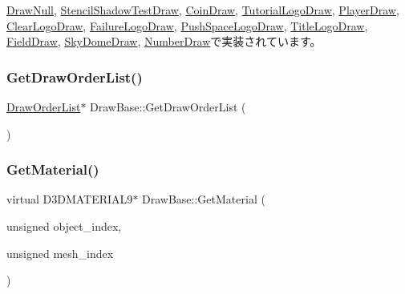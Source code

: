 \mbox{\hyperlink{class_draw_null_a8496ed1b1f765a331a8f1704122b8ca4}{Draw\+Null}}, \mbox{\hyperlink{class_stencil_shadow_test_draw_a387a97781f743aa0ea0727c050ef53b2}{Stencil\+Shadow\+Test\+Draw}}, \mbox{\hyperlink{class_coin_draw_a1d4ab1a5c480833b8d8e7fe226136ad5}{Coin\+Draw}}, \mbox{\hyperlink{class_tutorial_logo_draw_ad9df98aa8a5b11872dba6f6609589035}{Tutorial\+Logo\+Draw}}, \mbox{\hyperlink{class_player_draw_a6cecfb28942044efff0b9d6213b511a5}{Player\+Draw}}, \mbox{\hyperlink{class_clear_logo_draw_a04ae25ae9cb59df0d0c346b65baed3f2}{Clear\+Logo\+Draw}}, \mbox{\hyperlink{class_failure_logo_draw_a2a74fafba17b2f63b1c61abd67289afd}{Failure\+Logo\+Draw}}, \mbox{\hyperlink{class_push_space_logo_draw_a4990a9f5662af324f2632e8647cbdde4}{Push\+Space\+Logo\+Draw}}, \mbox{\hyperlink{class_title_logo_draw_ab727012424a02249a90a0f7d247371a8}{Title\+Logo\+Draw}}, \mbox{\hyperlink{class_field_draw_a67eabcc5ffd6697b87e89a1c4ddb95f6}{Field\+Draw}}, \mbox{\hyperlink{class_sky_dome_draw_a1d708782f13648724e423d1dca22b213}{Sky\+Dome\+Draw}}, \mbox{\hyperlink{class_number_draw_ad1d9a4cee49e7bddce51b5c58e739de9}{Number\+Draw}}で実装されています。

\mbox{\label{class_draw_base_a894bf875b80745150b250e584f00fa0c}} 
\subsubsection{\texorpdfstring{Get\+Draw\+Order\+List()}{GetDrawOrderList()}}
{\footnotesize\ttfamily \mbox{\hyperlink{class_draw_order_list}{Draw\+Order\+List}}$\ast$ Draw\+Base\+::\+Get\+Draw\+Order\+List (\begin{DoxyParamCaption}{ }\end{DoxyParamCaption})\hspace{0.3cm}{\ttfamily [inline]}}

\mbox{\label{class_draw_base_ad82a75dff8e4e2f2ebbec2dd0d0734e5}} 
\subsubsection{\texorpdfstring{Get\+Material()}{GetMaterial()}}
{\footnotesize\ttfamily virtual D3\+D\+M\+A\+T\+E\+R\+I\+A\+L9$\ast$ Draw\+Base\+::\+Get\+Material (\begin{DoxyParamCaption}\item[{unsigned}]{object\+\_\+index,  }\item[{unsigned}]{mesh\+\_\+index }\end{DoxyParamCaption})\hspace{0.3cm}{\ttfamily [pure virtual]}}



